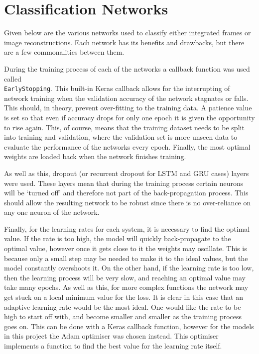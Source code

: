 \section{Classification Networks}

Given below are the various networks used to classify either integrated frames or image reconstructions. Each network has its benefits and drawbacks, but there are a few commonalities between them. 

During the training process of each of the networks a callback function was used called\\ \lstinline{EarlyStopping}. This built-in Keras callback allows for the interrupting of network training when the validation accuracy of the network stagnates or falls. This should, in theory, prevent over-fitting to the training data. A patience value is set so that even if accuracy drops for only one epoch it is given the opportunity to rise again. This, of course, means that the training dataset needs to be split into training and validation, where the validation set is more unseen data to evaluate the performance of the networks every epoch. Finally, the most optimal weights are loaded back when the network finishes training. 

As well as this, dropout (or recurrent dropout for LSTM and GRU cases) layers were used. These layers mean that during the training process certain neurons will be `turned off' and therefore not part of the back-propagation process. This should allow the resulting network to be robust since there is no over-reliance on any one neuron of the network.

Finally, for the learning rates for each system, it is necessary to find the optimal value. If the rate is too high, the model will quickly back-propagate to the optimal value, however once it gets close to it the weights may oscillate. This is because only a small step may be needed to make it to the ideal values, but the model constantly overshoots it. On the other hand, if the learning rate is too low, then the learning process will be very slow, and reaching an optimal value may take many epochs. As well as this, for more complex functions the network may get stuck on a local minimum value for the loss. It is clear in this case that an adaptive learning rate would be the most ideal. One would like the rate to be high to start off with, and become smaller and smaller as the training process goes on. This can be done with a Keras callback function, however for the models in this project the Adam optimiser\cite{Adam} was chosen instead. This optimiser implements a function to find the best value for the learning rate itself.

